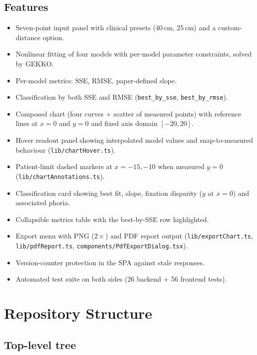 \documentclass[11pt,a4paper]{article}
\begin{document}
\subsection{Features}
\begin{itemize}[leftmargin=1.2em]
  \item Seven-point input panel with clinical presets (40\,cm, 25\,cm) and a
        custom-distance option.
  \item Nonlinear fitting of four models with per-model parameter constraints,
        solved by GEKKO.
  \item Per-model metrics: SSE, RMSE, paper-defined slope.
  \item Classification by both SSE and RMSE (\texttt{best\_by\_sse},
        \texttt{best\_by\_rmse}).
  \item Composed chart (four curves + scatter of measured points) with
        reference lines at $x=0$ and $y=0$ and fixed axis domain $[-20,20]$.
  \item Hover readout panel showing interpolated model values and
        snap-to-measured behaviour (\texttt{lib/chartHover.ts}).
  \item Patient-limit dashed markers at $x = -15, -10$ when measured
        $y = 0$ (\texttt{lib/chartAnnotations.ts}).
  \item Classification card showing best fit, slope, fixation disparity
        ($y$ at $x=0$) and associated phoria.
  \item Collapsible metrics table with the best-by-SSE row highlighted.
  \item Export menu with PNG ($2\times$) and PDF report output
        (\texttt{lib/exportChart.ts}, \texttt{lib/pdfReport.ts},
        \texttt{components/PdfExportDialog.tsx}).
  \item Version-counter protection in the SPA against stale responses.
  \item Automated test suite on both sides (26 backend + 56 frontend tests).
\end{itemize}

\section{Repository Structure}
\label{sec:structure}

\subsection{Top-level tree}
\end{document}
